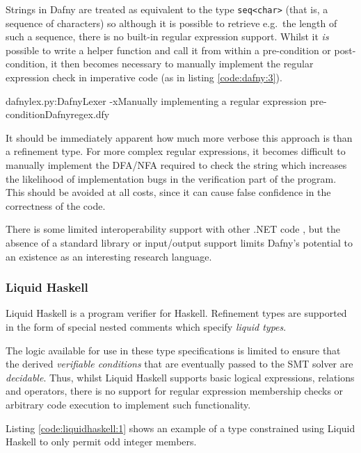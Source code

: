 \documentclass[a4paper,openany,12pt]{book}
\begin{document}
Strings in Dafny are treated as equivalent to the type \texttt{seq<char>} (that is, a sequence of characters) so
although it is possible to retrieve e.g.\ the length of such a sequence, there is no built-in regular expression support.
Whilst it \emph{is} possible to write a helper function and call it from within a pre-condition or post-condition, it
then becomes necessary to manually implement the regular expression check in imperative code (as in listing \ref{code:dafny:3}).

\begin{mycodefile}{dafnylex.py:DafnyLexer -x}{\label{code:dafny:3}Manually implementing a regular expression pre-condition}{Dafny}{regex.dfy}

    It should be immediately apparent how much more verbose this approach is than a refinement type.
    For more complex regular expressions, it becomes difficult to manually implement the DFA/NFA required to check the
    string which increases the likelihood of implementation bugs in the verification part of the program.
    This should be avoided at all costs, since it can cause false confidence in the correctness of the code.

    \vspace{0.5em}
\end{mycodefile}


There is some limited interoperability support with other .NET code \citep{wilcowio}, but the absence of a standard
library or input/output support limits Dafny's potential to an existence as an interesting research language.

\subsubsection{Liquid Haskell}
\label{lh}
Liquid Haskell is a program verifier for Haskell.
Refinement types are supported in the form of special nested comments which specify \emph{liquid types}.

The logic available for use in these type specifications is limited to ensure that the derived \emph{verifiable
conditions} that are eventually passed to the SMT solver are \emph{decidable}.
Thus, whilst Liquid Haskell supports basic logical expressions, relations and operators, there is no support for regular
expression membership checks or arbitrary code execution to implement such functionality.

Listing \ref{code:liquidhaskell:1} shows an example of a type constrained using Liquid Haskell to only permit odd
integer members.
\end{document}
